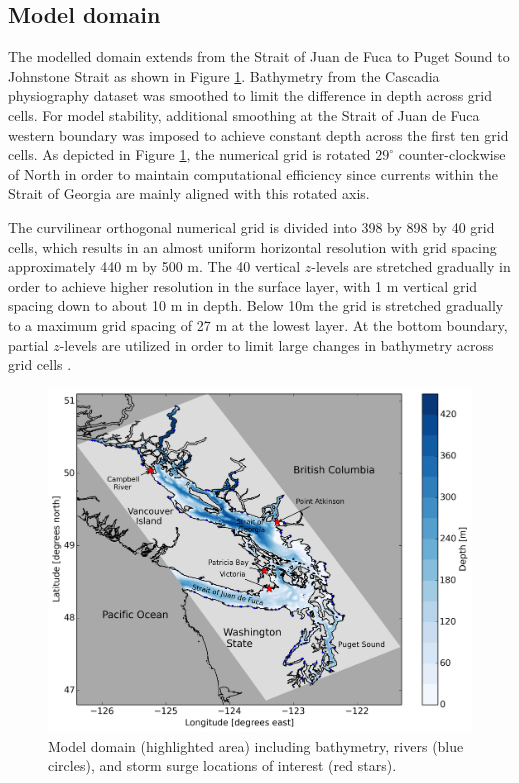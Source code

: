 \documentclass[pdftex,10pt]{article}
\begin{document}
\subsection{Model domain}
The modelled domain extends from the Strait of Juan de Fuca to Puget Sound to Johnstone Strait as shown in Figure \ref{fig:domain}. Bathymetry from the Cascadia physiography dataset \citep{haugerud1999digital} was smoothed to limit the difference in depth across grid cells. For model stability, additional smoothing at the Strait of Juan de Fuca western boundary was imposed to achieve constant depth across the first ten grid cells. As depicted in Figure \ref{fig:domain}, the numerical grid is rotated $29^{\circ}$ counter-clockwise of North in order to maintain computational efficiency since currents within the Strait of Georgia are mainly aligned with this rotated axis. 

The curvilinear orthogonal numerical grid is divided into 398 by 898 by 40 grid cells, which results in an almost uniform horizontal resolution with grid spacing approximately 440 m by 500 m. The 40 vertical $z$-levels are stretched gradually in order to achieve higher resolution in the surface layer, with 1 m vertical grid spacing down to about 10 m in depth. Below 10m the grid is stretched gradually to a maximum grid spacing of 27 m at the lowest layer. At the bottom boundary, partial $z$-levels are utilized in order to limit large changes in bathymetry across grid cells \citep{madec2012nemo}. 


\begin{figure}[h]
\centering
\includegraphics[scale=0.5]{Figures/bathy.pdf}
\caption{Model domain (highlighted area) including bathymetry, rivers (blue circles), and storm surge locations of interest  (red stars).}\label{fig:domain}
\end{figure}
\end{document}
